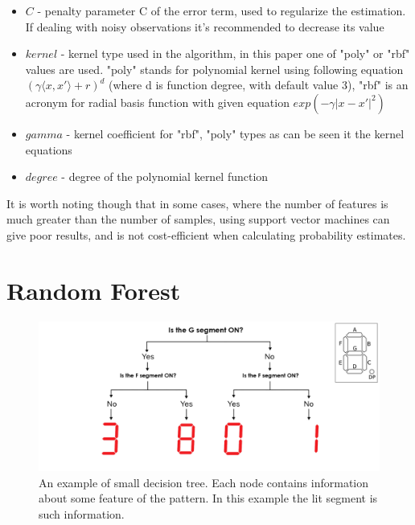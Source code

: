 \begin{itemize}
	\item $C$ - penalty parameter C of the error term, used to regularize the estimation. If dealing with noisy observations it's recommended to decrease its value
	\item $kernel$ - kernel type used in the algorithm, in this paper one of "poly" or "rbf" values are used. "poly" stands for polynomial kernel using following equation $(\gamma \langle x, x' \rangle + r)^{d}$ (where d is function degree, with default value 3), "rbf" is an acronym for radial basis function with given equation $exp(-\gamma|x - x'|^{2})$
	\item $gamma$ - kernel coefficient for "rbf", "poly" types as can be seen it the kernel equations
	\item $degree$ - degree of the polynomial kernel function
\end{itemize}

It is worth noting though that in some cases, where the number of features is much greater than the number of samples, using support vector machines can give poor results, and is not cost-efficient when calculating probability estimates. 

\section{Random Forest}

\begin{figure}[htp]
	\centering
	\includegraphics[width=1.0\textwidth]{Figures/rf_visualization_funny.jpg}
	\caption{An example of small decision tree. Each node contains information about some feature of the pattern. In this example the lit segment is such information.}
	\label{fig:rf_visualization_funny}\vspace{-3pt}
\end{figure}

